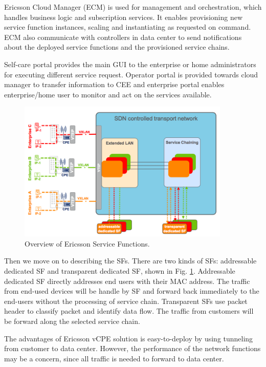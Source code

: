 Ericsson Cloud Manager (ECM) is used for management and orchestration, which handles business logic and subscription services.
It enables provisioning new service function instances, scaling and instantiating as requested on command.
ECM also communicate with controllers in data center to send notifications about the deployed service functions and the provisioned service chains.

Self-care portal provides the main GUI to the enterprise or home administrators for executing different service request.
Operator portal is provided towards cloud manager to transfer information to CEE and enterprise portal enables enterprise/home user to monitor and act on the services available.


\begin{figure}[!t]
\centering
\includegraphics[width=0.9\textwidth]{./fig/ericsson_sf.png}
\caption{Overview of Ericsson Service Functions. \cite{ericsson-vcpe}}
\label{fig:ericsson_sf}
\end{figure}

Then we move on to describing the SFs. There are two kinds of SFs: addressable dedicated SF and transparent dedicated SF, shown in Fig. \ref{fig:ericsson_sf}.
Addressable dedicated SF directly addresses end users with their MAC address.
The traffic from end-used devices will be handle by SF and forward back immediately to the end-users without the processing of service chain.
Transparent SFs use packet header to classify packet and identify data flow.
The traffic from customers will be forward along the selected service chain.

The advantages of Ericsson vCPE solution is easy-to-deploy by using tunneling from customer to data center.
However, the performance of the network functions may be a concern, since all traffic is needed to forward to data center.



